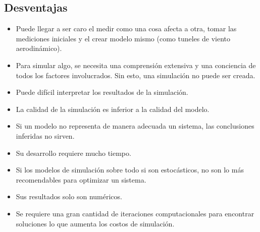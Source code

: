 \documentclass[letterpaper, 12pt]{article}
\begin{document}
\begin{justify}
        \section*{Desventajas}
        \justify
        \begin{itemize}
            \item Puede llegar a ser caro el medir como una cosa afecta a otra, tomar las mediciones iniciales y el crear modelo mismo (como tuneles de viento aerodinámico).
            \item Para simular algo, se necesita una comprensión extensiva y una conciencia de todos los factores involucrados. Sin esto, una simulación no puede ser creada.
            \item Puede difícil interpretar los resultados de la simulación.
            \item La calidad de la simulación es inferior a la calidad del modelo.
            \item Si un modelo no representa de manera adecuada un sistema, las conclusiones inferidas no sirven.
            \item Su desarrollo requiere mucho tiempo.
            \item Si los modelos de simulación sobre todo si son estocásticos, no son lo más recomendables para optimizar un sistema.
            \item Sus resultados solo son numéricos.
            \item Se requiere una gran cantidad de iteraciones computacionales para encontrar soluciones lo que aumenta los costos de simulación.
        \end{itemize}

\end{justify}
\end{document}
